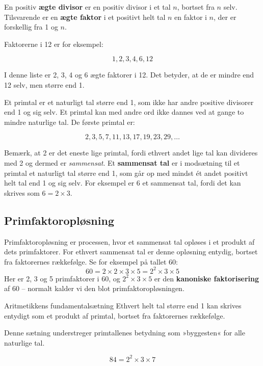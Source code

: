 En positiv \textbf{ægte divisor} er en positiv divisor i et tal \(n\), bortset fra \(n\) selv. Tilsvarende er en \textbf{ægte faktor} i et positivt helt tal \(n\) en faktor i \(n\), der er forskellig fra 1 og \(n\).

Faktorerne i 12 er for eksempel:

\[
1, 2, 3, 4, 6, 12
\]

I denne liste er 2, 3, 4 og 6 ægte faktorer i 12. Det betyder, at de er mindre end 12 selv, men større end 1.

Et primtal er et naturligt tal større end 1, som ikke har andre positive divisorer end 1 og sig selv. Et primtal kan med andre ord ikke dannes ved at gange to mindre naturlige tal. De første primtal er:

\[
2, 3, 5, 7, 11, 13, 17, 19, 23, 29, \ldots
\]

Bemærk, at 2 er det eneste lige primtal, fordi ethvert andet lige tal kan divideres med 2 og dermed er \textit{sammensat}. Et \textbf{sammensat tal} er i modsætning til et primtal et naturligt tal større end 1, som går op med mindst ét andet positivt helt tal end 1 og sig selv. For eksempel er 6 et sammensat tal, fordi det kan skrives som \(6 = 2 \times 3\).

\subsection*{Primfaktoropløsning}
Primfaktoropløsning er processen, hvor et sammensat tal opløses i et produkt af dets primfaktorer. For ethvert sammensat tal er denne opløsning entydig, bortset fra faktorernes rækkefølge. Se for eksempel på tallet 60:
\[
60 = 2 \times 2 \times 3 \times 5 = 2^2 \times 3 \times 5
\]
Her er 2, 3 og 5 primfaktorer i 60, og $2^2 \times 3 \times 5$ er den \textbf{kanoniske faktorisering} af 60 -- normalt kalder vi den blot primfaktoropløsningen.

\begin{theorem}{Aritmetikkens fundamentalsætning}
Ethvert helt tal større end 1 kan skrives entydigt som et produkt af primtal, bortset fra faktorernes rækkefølge.
\end{theorem}

Denne sætning understreger primtallenes betydning som »byggesten« for alle naturlige tal.

\begin{example}

\[
84 = 2^2 \times 3 \times 7
\]
\end{example}

